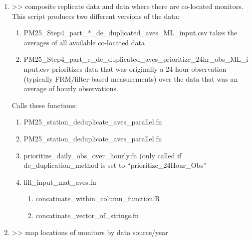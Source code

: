 \begin{enumerate}[nolistsep]

\item {} >> composite replicate data and data where there are co-located monitors. This script produces two different versions of the data:   %
\begin{enumerate}
\item PM25\_Step4\_part\_*\_de\_duplicated\_aves\_ML\_input.csv takes the averages of all available co-located data
\item PM25\_Step4\_part\_e\_de\_duplicated\_aves\_prioritize\_24hr\_obs\_ML\_input.csv prioritizes data that was originally a 24-hour observation (typically FRM/filter-based measurements) over the data that was an average of hourly observations. 
\end{enumerate}

 Calls these functions:
  \begin{enumerate}
  \item PM25\_station\_deduplicate\_aves\_parallel.fn%
  \item PM25\_station\_deduplicate\_aves\_parallel.fn
  \item prioritize\_daily\_obs\_over\_hourly.fn (only called if de\_duplication\_method is set to ``prioritize\_24Hour\_Obs''
  \item fill\_input\_mat\_aves.fn %
    \begin{enumerate}
    \item concatinate\_within\_column\_function.R
    \item concatinate\_vector\_of\_strings.fn
    \end{enumerate}

  \end{enumerate}
\item {} >> map locations of monitors by data source/year


\end{enumerate}

